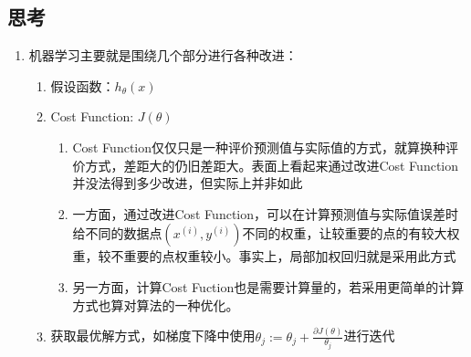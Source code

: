 \subsection{思考}
{\color{red}{以下内容均为个人的思考，不一定是正确的。}}
\begin{enumerate}
	\item 机器学习主要就是围绕几个部分进行各种改进：
	\begin{enumerate}
		\item 假设函数：$h_\theta(x)$
		\item Cost Function: $J(\theta)$
			\begin{enumerate}
				\item Cost Function仅仅只是一种评价预测值与实际值的方式，就算换种评价方式，差距大的仍旧差距大。表面上看起来通过改进Cost Function并没法得到多少改进，但实际上并非如此
				\item 一方面，通过改进Cost Function，可以在计算预测值与实际值误差时给不同的数据点$(x^{(i)}, y^{(i)})$不同的权重，让较重要的点的有较大权重，较不重要的点权重较小。事实上，局部加权回归就是采用此方式
				\item 另一方面，计算Cost Fuction也是需要计算量的，若采用更简单的计算方式也算对算法的一种优化。{\color{gray}{暂未找到实例}}
			\end{enumerate}
		\item 获取最优解方式，如梯度下降中使用$\theta_j := \theta_j + \frac{\partial J(\theta)}{\theta_j}$进行迭代

	\end{enumerate}
\end{enumerate}
















